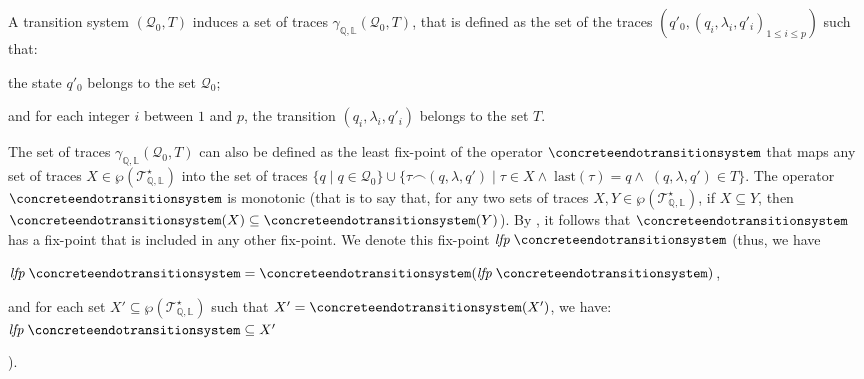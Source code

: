 \documentclass[10pt,a4paper]{llncs}
\newcommand{\states}{\mathbb{Q}}
\newcommand{\labels}{\mathbb{L}}
\newcommand{\final}[1][\tau]{\textrm{last}(#1)}
\newcommand{\compose}{\smallfrown}
\newcommand{\transitionsystemwoparentheses}{\mathcal{Q}_0,T}
\newcommand{\transitionsystem}{(\transitionsystemwoparentheses)}
\newcommand{\traces}[1][\states,\labels]{\mathcal{T}^{\star}_{#1}}
\newcommand{\gammatransitionsystem}[1][\states,\labels]{\gamma_{#1}}
\newcommand{\lfp}[1]{\textit{lfp}\;#1}
\begin{document}
A transition system $\transitionsystem$ induces a set of traces $\gammatransitionsystem\transitionsystem$, that is defined as the set of the traces $(q'_0,(q_i,\lambda_i,q'_i)_{1\leq i \leq p})$ such that: \begin{inparaenum}
\item the state $q'_0$ belongs to the set $\mathcal{Q}_0$;
\item and for each integer $i$ between $1$ and $p$, the transition $(q_i,\lambda_i,q'_i)$ belongs to the set $T$.
\end{inparaenum}
The set of traces $\gammatransitionsystem\transitionsystem$ can also be defined as the least fix-point of the operator $\concreteendotransitionsystem$ that maps any set of traces $X\in\wp(\traces)$ into the set of traces $\{q\;|\;q\in\mathcal{Q}_0\}\cup\{\tau\compose (q,\lambda,q')\;|\;\tau\in X \wedge \; \final[\tau]=q \wedge \;(q,\lambda,q')\in T\}$.
The operator $\concreteendotransitionsystem$ is monotonic (that is to say that,
for any two sets of traces $X,Y\in\wp(\traces)$, if $X\subseteq Y$, then
$\concreteendotransitionsystem(X)\subseteq\concreteendotransitionsystem(Y)$).
By \cite{Tarski}, it follows that $\concreteendotransitionsystem$ has a fix-point that is included in any other fix-point.
We denote this fix-point $\lfp \concreteendotransitionsystem$
(thus, we have \begin{inparaenum}
  \item$\lfp{\concreteendotransitionsystem}=\concreteendotransitionsystem(\lfp{\concreteendotransitionsystem})$,
  \item and for each set $X'\subseteq \wp(\traces)$ such that $X'=\concreteendotransitionsystem(X')$, we have: $\lfp \concreteendotransitionsystem \subseteq X'$ \end{inparaenum}).
\end{document}
